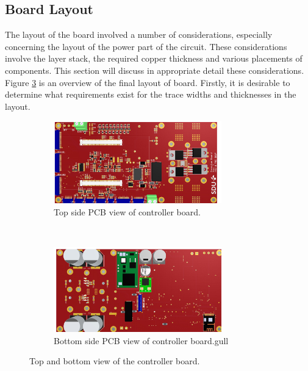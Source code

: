 \subsection{Board Layout} %
\label{sub:board_layout}
The layout of the board involved a number of considerations, especially concerning the layout of the power part of the circuit.
These considerations involve the layer stack, the required copper thickness and various placements of components.
This section will discuss in appropriate detail these considerations.
Figure \ref{fig:board_layout} is an overview of the final layout of board.
Firstly, it is desirable to determine what requirements exist for the trace widths and thicknesses in the layout.

\begin{figure}
	\begin{subfigure}[b]{\textwidth}
	\centering
	\includegraphics[width=0.8\textwidth]{graphics/top_side_pcb}
	\caption{Top side PCB view of controller board.}
	\label{fig:top_side_pcb_view}
	\end{subfigure}\\

	\begin{subfigure}[b]{\textwidth}
	\centering
	\includegraphics[width=0.8\textwidth,angle=180]{graphics/bottom_side_pcb}
	\caption{Bottom side PCB view of controller board.gull}
	\label{fig:botton_side_pcb_view}
	\end{subfigure}
	\caption{Top and bottom view of the controller board.}
	\label{fig:board_layout}
\end{figure}

